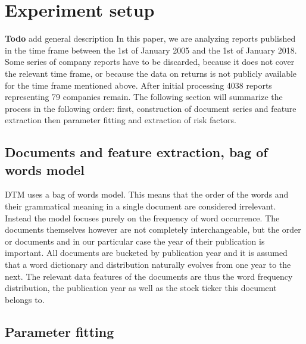 \documentclass[12pt,journal,letterpaper,oneside,onecolumn]{IEEEtran}
\begin{document}
\section{Experiment setup}
\textbf{Todo} add general description
In this paper, we are analyzing reports published in the time frame between the 1st of January 2005 and the 1st of January 2018. Some series of company reports have to be discarded, because it does not cover the relevant time frame, or because the data on returns is not publicly available for the time frame mentioned above. After initial processing 4038 reports representing 79 companies remain. 
The following section will summarize the process in the following order: first, construction of document series  and feature extraction then parameter fitting and extraction of risk factors.

\subsection{Documents and feature extraction, bag of words model}
DTM uses a bag of words model. This means that the order of the words and their grammatical meaning in a single document are considered irrelevant. Instead the model focuses purely on the frequency of word occurrence. 
The documents themselves however are not completely interchangeable, but the order or documents and in our particular case the year of their publication is important.
All documents are bucketed by publication year and it is assumed that a word dictionary and distribution naturally evolves from one year to the next.
The relevant data features of the documents are thus the word frequency distribution, the publication year as well as the stock ticker this document belongs to.

\subsection{Parameter fitting}
\end{document}
